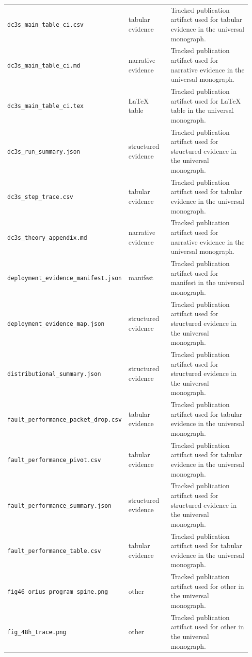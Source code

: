 \begin{longtable}{p{}p{}p{}}
\texttt{dc3s\_main\_table\_ci.csv} & tabular evidence & Tracked publication artifact used for tabular evidence in the universal monograph.\\
\texttt{dc3s\_main\_table\_ci.md} & narrative evidence & Tracked publication artifact used for narrative evidence in the universal monograph.\\
\texttt{dc3s\_main\_table\_ci.tex} & LaTeX table & Tracked publication artifact used for LaTeX table in the universal monograph.\\
\texttt{dc3s\_run\_summary.json} & structured evidence & Tracked publication artifact used for structured evidence in the universal monograph.\\
\texttt{dc3s\_step\_trace.csv} & tabular evidence & Tracked publication artifact used for tabular evidence in the universal monograph.\\
\texttt{dc3s\_theory\_appendix.md} & narrative evidence & Tracked publication artifact used for narrative evidence in the universal monograph.\\
\texttt{deployment\_evidence\_manifest.json} & manifest & Tracked publication artifact used for manifest in the universal monograph.\\
\texttt{deployment\_evidence\_map.json} & structured evidence & Tracked publication artifact used for structured evidence in the universal monograph.\\
\texttt{distributional\_summary.json} & structured evidence & Tracked publication artifact used for structured evidence in the universal monograph.\\
\texttt{fault\_performance\_packet\_drop.csv} & tabular evidence & Tracked publication artifact used for tabular evidence in the universal monograph.\\
\texttt{fault\_performance\_pivot.csv} & tabular evidence & Tracked publication artifact used for tabular evidence in the universal monograph.\\
\texttt{fault\_performance\_summary.json} & structured evidence & Tracked publication artifact used for structured evidence in the universal monograph.\\
\texttt{fault\_performance\_table.csv} & tabular evidence & Tracked publication artifact used for tabular evidence in the universal monograph.\\
\texttt{fig46\_orius\_program\_spine.png} & other & Tracked publication artifact used for other in the universal monograph.\\
\texttt{fig\_48h\_trace.png} & other & Tracked publication artifact used for other in the universal monograph.\\

\end{longtable}
